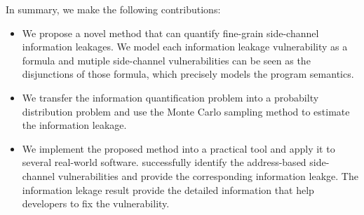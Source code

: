 In summary, we make the following contributions:

\begin{itemize}
	\item We propose a novel method that can quantify fine-grain side-channel
        information leakages. We model each information leakage vulnerability as a formula and 
        mutiple side-channel vulnerabilities can be seen as the disjunctions of those formula, which
        precisely models the program semantics.
        \item We transfer the information quantification problem into a probabilty distribution problem and 
        use the Monte Carlo sampling method to estimate the information leakage. %
	\item We implement the proposed method into a practical tool and apply it to several real-world software. \tool{} 
        successfully identify the address-based side-channel vulnerabilities and provide the corresponding
        information leakge. The information lekage result provide the detailed information that help developers
        to fix the vulnerability.
\end{itemize}



